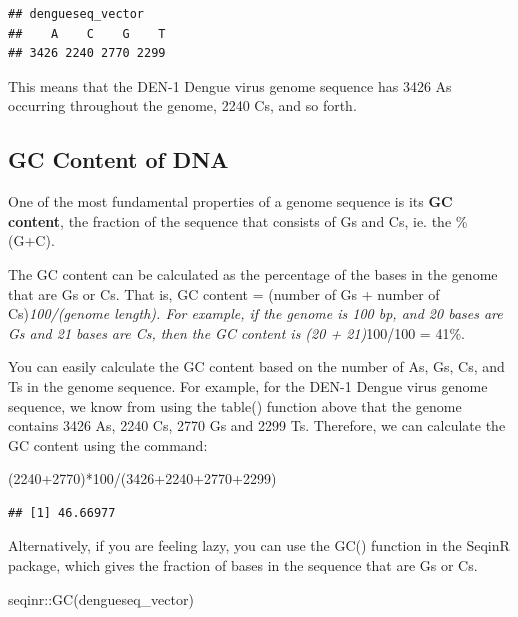 \documentclass[
]{book}
\newenvironment{Shaded}{\begin{snugshade}}{\end{snugshade}}
\newcommand{\DecValTok}[1]{\textcolor[rgb]{0.00,0.00,0.81}{#1}}
\newcommand{\FunctionTok}[1]{\textcolor[rgb]{0.00,0.00,0.00}{#1}}
\newcommand{\NormalTok}[1]{#1}
\newcommand{\SpecialCharTok}[1]{\textcolor[rgb]{0.00,0.00,0.00}{#1}}
\begin{document}
\begin{verbatim}
## dengueseq_vector
##    A    C    G    T 
## 3426 2240 2770 2299
\end{verbatim}

This means that the DEN-1 Dengue virus genome sequence has 3426 As occurring throughout the genome, 2240 Cs, and so forth.

\hypertarget{gc-content-of-dna}{%
\subsection{GC Content of DNA}\label{gc-content-of-dna}}

One of the most fundamental properties of a genome sequence is its \textbf{GC content}, the fraction of the sequence that consists of Gs and Cs, ie. the \%(G+C).

The GC content can be calculated as the percentage of the bases in the genome that are Gs or Cs. That is, GC content = (number of Gs + number of Cs)\emph{100/(genome length). For example, if the genome is 100 bp, and 20 bases are Gs and 21 bases are Cs, then the GC content is (20 + 21)}100/100 = 41\%.

You can easily calculate the GC content based on the number of As, Gs, Cs, and Ts in the genome sequence. For example, for the DEN-1 Dengue virus genome sequence, we know from using the table() function above that the genome contains 3426 As, 2240 Cs, 2770 Gs and 2299 Ts. Therefore, we can calculate the GC content using the command:

\begin{Shaded}
\begin{Highlighting}[]
\NormalTok{(}\DecValTok{2240}\SpecialCharTok{+}\DecValTok{2770}\NormalTok{)}\SpecialCharTok{*}\DecValTok{100}\SpecialCharTok{/}\NormalTok{(}\DecValTok{3426}\SpecialCharTok{+}\DecValTok{2240}\SpecialCharTok{+}\DecValTok{2770}\SpecialCharTok{+}\DecValTok{2299}\NormalTok{)}
\end{Highlighting}
\end{Shaded}

\begin{verbatim}
## [1] 46.66977
\end{verbatim}

Alternatively, if you are feeling lazy, you can use the GC() function in the SeqinR package, which gives the fraction of bases in the sequence that are Gs or Cs.

\begin{Shaded}
\begin{Highlighting}[]
\NormalTok{seqinr}\SpecialCharTok{::}\FunctionTok{GC}\NormalTok{(dengueseq\_vector)}
\end{Highlighting}
\end{Shaded}
\end{document}
